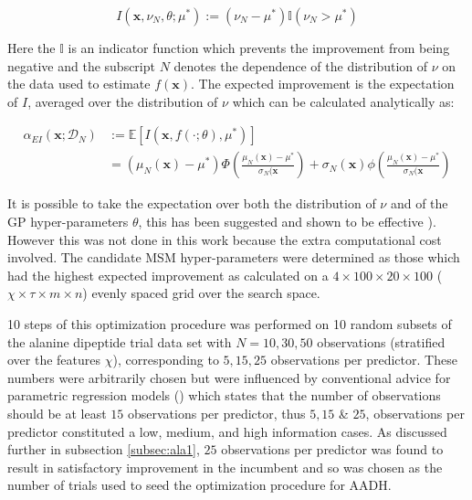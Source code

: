\begin{equation}
    I(\mathbf{x}, \nu_{N}, \theta; \mu^{*}):=(\nu_{N} - \mu^{*}) \mathbb{I}(\nu_{N} > \mu^{*})
\end{equation}

Here the $\mathbb{I}$ is an indicator function which prevents the improvement from being negative and the subscript $N$ denotes the dependence of the distribution of $\nu$ on the data used to estimate $f(\mathbf{x})$. The expected improvement is the expectation of $I$, averaged over the distribution of $\nu$ which can be calculated analytically as: 

\begin{align}
        \alpha_{EI}(\mathbf{x}; \mathcal{D}_{N}) & := \mathbb{E}\left[I(\mathbf{x}, f(\cdot; \theta), \mu^{*})\right] \\
        & = (\mu_{N}(\mathbf{x}) - \mu^{*})\Phi\left( \frac{ \mu_{N}(\mathbf{x}) - \mu^{*} }{\sigma_{N}(\mathbf{x} } \right ) + \sigma_{N}(\mathbf{x})\phi\left( \frac{ \mu_{N}(\mathbf{x}) - \mu^{*} }{\sigma_{N}(\mathbf{x} } \right )
\end{align}

It is possible to take the expectation over both the distribution of $\nu$ and of the GP hyper-parameters $\theta$, this has been suggested and shown to be effective \cite{snoekPracticalBayesianOptimization}). However this was not done in this work because the extra computational cost involved. The candidate MSM hyper-parameters were determined as those which had the highest expected improvement as calculated on a $4 \times 100 \times 20 \times 100$ ($\chi \times \tau \times m \times n$) evenly spaced grid over the search space.

10 steps of this optimization procedure was performed on 10 random subsets of the alanine dipeptide trial data  set with $N=10, 30, 50$ observations  (stratified over the features $\chi$), corresponding to $5, 15, 25$ observations per predictor. These numbers were arbitrarily chosen but were influenced by conventional advice for parametric regression models (\cite{harrelRegressionModelingStrategies2015}) which states that the number of observations should be at least $15$ observations per predictor, thus $5, 15$ \& $25$, observations per predictor constituted a low, medium, and high information cases.  As discussed further in subsection \ref{subsec:ala1}, $25$ observations per predictor was found to result in satisfactory improvement in the incumbent and so was chosen as the number of trials used to seed the optimization procedure for AADH. 


